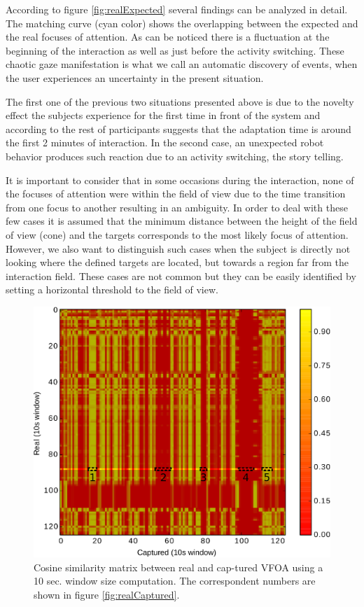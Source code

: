 \documentclass{sig-alternate}
\begin{document}
According to figure \ref{fig:realExpected} several findings can be analyzed in detail. The matching curve (cyan color) shows the overlapping between the expected and the real focuses of attention. As can be noticed there is a fluctuation at the beginning of the interaction as well as just before the activity switching. These chaotic gaze manifestation is what we call an automatic discovery of events, when the user experiences an uncertainty in the present situation. 

The first one of the previous two situations presented above is due to the novelty effect the subjects experience for the first time in front of the system and according to the rest of participants suggests that the adaptation time is around the first 2 minutes of interaction. In the second case, an unexpected robot behavior produces such reaction due to an activity switching, the story telling.

It is important to consider that in some occasions during the interaction, none of the focuses of attention were within the field of view due to the time transition from one focus to another resulting in an ambiguity. In order to deal with these few cases it is assumed that the minimum distance between the height of the field of view (cone) and the targets corresponds to the most likely focus of attention. However, we also want to distinguish such cases when the subject is directly not looking where the defined targets are located, but towards a region far from the interaction field. These cases are not common but they can be easily identified by setting a horizontal threshold to the field of view.

\begin{figure}[h!]
    \centering
    \includegraphics[width=0.7\columnwidth]{bitmap}
    \caption{\small Cosine similarity matrix between real and cap-tured VFOA using a 10 sec. window size computation. The correspondent numbers are shown in figure \ref{fig:realCaptured}.}
    \label{fig:bitmap}
\end{figure}
\end{document}
